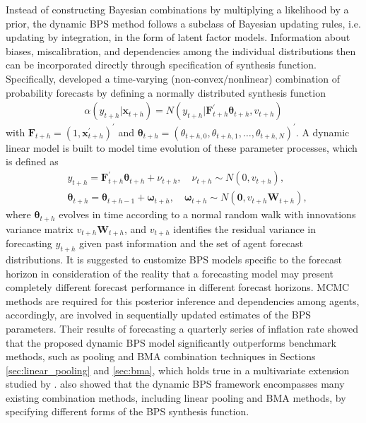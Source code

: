 \documentclass[11pt]{article}
\begin{document}
Instead of constructing Bayesian combinations by multiplying a likelihood by a prior, the dynamic BPS method follows a subclass of Bayesian updating rules, i.e. updating by integration, in the form of latent factor models. Information about biases, miscalibration, and dependencies among the individual distributions then can be incorporated directly through specification of synthesis function. Specifically, \citet{McAlinn2019-kn} developed a time-varying (non-convex/nonlinear) combination of probability forecasts by defining a normally distributed synthesis function
\begin{align*}
\alpha\left(y_{t+h} | \boldsymbol{x}_{t+h}\right)=N\left(y_{t+h} | \boldsymbol{F}_{t+h}^{\prime} \boldsymbol{\theta}_{t+h}, v_{t+h}\right)
\end{align*}
with $\boldsymbol{F}_{t+h}=\left(1, \boldsymbol{x}_{t+h}^{\prime}\right)^{\prime}$ and $\boldsymbol{\theta}_{t+h}=\left(\theta_{t+h, 0}, \theta_{t+h, 1}, \ldots, \theta_{t+h, N}\right)^{\prime}$. A dynamic linear model is built to model time evolution of these parameter processes, which is defined as
\begin{align*}
&y_{t+h}=\boldsymbol{F}_{t+h}^{\prime} \boldsymbol{\theta}_{t+h}+\nu_{t+h}, \quad \nu_{t+h} \sim N\left(0, v_{t+h}\right), \\
&\boldsymbol{\theta}_{t+h}=\boldsymbol{\theta}_{t+h-1}+\boldsymbol{\omega}_{t+h}, \quad \boldsymbol{\omega}_{t+h} \sim N\left(\boldsymbol{0}, v_{t+h} \boldsymbol{W}_{t+h}\right),
\end{align*}
where $\boldsymbol{\theta}_{t+h}$ evolves in time according to a normal random walk with innovations variance matrix $v_{t+h} \boldsymbol{W}_{t+h}$, and $v_{t+h}$ identifies the residual variance in forecasting $y_{t+h}$ given past information and the set of agent forecast distributions. It is suggested to customize BPS models specific to the forecast horizon in consideration of the reality that a forecasting model may present completely different forecast performance in different forecast horizons. MCMC methods are required for this posterior inference and dependencies among agents, accordingly, are involved in sequentially updated estimates of the BPS parameters. Their results of forecasting a quarterly series of inflation rate showed that the proposed dynamic BPS model significantly outperforms benchmark methods, such as pooling and BMA combination techniques in Sections \ref{sec:linear_pooling} and \ref{sec:bma}, which holds true in a multivariate extension studied by \citet{McAlinn2020-qq}. \citet{McAlinn2019-kn} also showed that the dynamic BPS framework encompasses many existing combination methods, including linear pooling and BMA methods, by specifying different forms of the BPS synthesis function.
\end{document}
